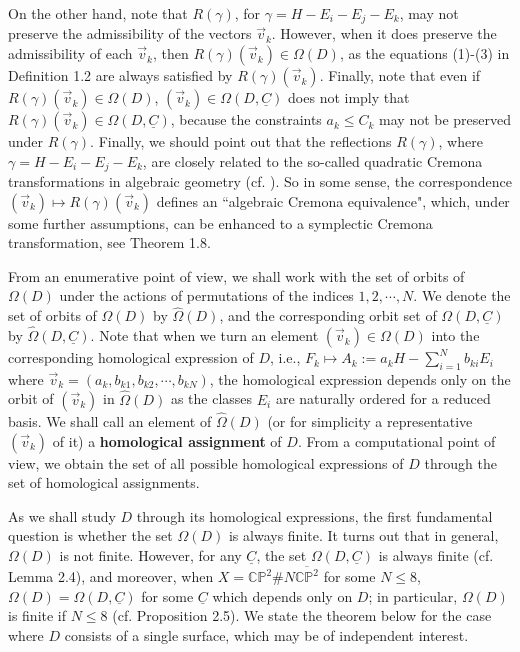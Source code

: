 \documentclass[11pt]{amsart}
\theoremstyle{plain}
\numberwithin{theorem}{section}
\theoremstyle{definition}
\newcommand{\C}{{\mathbb C}}
\renewcommand{\P}{{\mathbb P}}
\begin{document}
On the other hand, note that $R(\gamma)$, for $\gamma=H-E_i-E_j-E_k$, may not preserve the admissibility of 
the vectors $\vec{v}_k$. However, when it does preserve the admissibility of each $\vec{v}_k$, then 
$R(\gamma)(\vec{v}_k)\in \Omega(D)$, as the equations (1)-(3) in Definition 1.2 are always satisfied by
$R(\gamma)(\vec{v}_k)$. Finally, note that even if $R(\gamma)(\vec{v}_k)\in \Omega(D)$, 
$(\vec{v}_k)\in \Omega(D,\underline{C})$ does not imply that $R(\gamma)(\vec{v}_k)\in \Omega(D,\underline{C})$, 
because the constraints $a_k\leq C_k$ may not be preserved under $R(\gamma)$. Finally, we should point out 
that the reflections $R(\gamma)$, where $\gamma=H-E_i-E_j-E_k$, are closely related to the so-called quadratic Cremona transformations in algebraic geometry  (cf. \cite{AC}). So in some sense, the correspondence 
$(\vec{v}_k)\mapsto R(\gamma)(\vec{v}_k)$ defines an ``algebraic Cremona equivalence", which, under some further assumptions, can be enhanced to a symplectic Cremona transformation, see Theorem 1.8. 

\vspace{1mm}

From an enumerative point of view, we shall work with the set of orbits of $\Omega(D)$ under the actions of permutations of the indices $1,2,\cdots,N$. We denote the set of orbits of $\Omega(D)$ by $\hat{\Omega}(D)$, 
and the corresponding orbit set of $\Omega(D,\underline{C})$ by $\hat{\Omega}(D,\underline{C})$. Note that 
when we turn an element $(\vec{v}_k)\in \Omega(D)$ into the corresponding homological expression of $D$, i.e., $F_k\mapsto A_k:=a_kH-\sum_{i=1}^N b_{ki}E_i$ where $\vec{v}_k=(a_k, b_{k1},b_{k2},\cdots, b_{kN})$, the homological expression depends only on the orbit of $(\vec{v}_k)$ in $\hat{\Omega}(D)$ as the classes $E_i$ are naturally ordered for a reduced basis. We shall call an element of $\hat{\Omega}(D)$ (or for simplicity a representative $(\vec{v}_k)$ of it) a {\bf homological assignment} of $D$. From a computational point of view, 
we obtain the set of all possible homological expressions of $D$ through the set of homological assignments. 

\vspace{1mm}

As we shall study $D$ through its homological expressions, the first fundamental question is whether the set
$\Omega(D)$ is always finite. It turns out that in general, $\Omega(D)$ is not finite. However, for any 
$\underline{C}$, the set $\Omega(D,\underline{C})$ is always finite (cf. Lemma 2.4), and moreover, when 
$X=\C\P^2\# N\overline{\C\P^2}$ for some $N\leq 8$, $\Omega(D)= \Omega(D,\underline{C})$ for some 
$\underline{C}$ which depends only on $D$; in particular, $\Omega(D)$ is finite if $N\leq 8$ 
(cf. Proposition 2.5). We state the theorem below for the case where $D$ consists of a single surface, which may be of independent interest.
\end{document}
